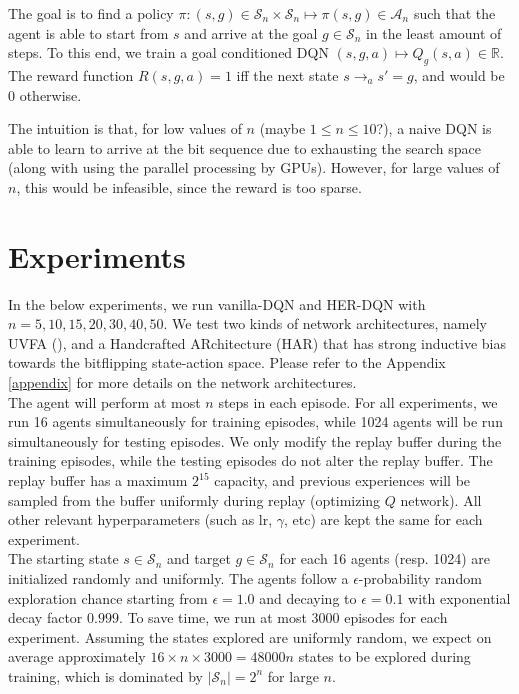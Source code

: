 \documentclass{article}
\begin{document}
The goal is to find a policy $\pi: (s,g)  \in \mathcal{S}_n \times \mathcal{S}_n \mapsto \pi(s,g) \in \mathcal{A}_n$ such that the agent is able to start from $s$ and arrive at the goal $g \in \mathcal{S}_n$ in the least amount of steps. To this end, we train a goal conditioned DQN $(s,g,a) \mapsto Q_g(s,a) \in \mathbb{R}$. The reward function $R(s,g,a)=1$ iff the next state $s \rightarrow_a s' = g$, and would be $0$ otherwise.

The intuition is that, for low values of $n$ (maybe $1 \leq n \leq 10$?), a naive DQN is able to learn to arrive at the bit sequence due to exhausting the search space (along with using the parallel processing by GPUs). However, for large values of $n$, this would be infeasible, since the reward is too sparse.


\section{Experiments}
In the below experiments, we run vanilla-DQN and HER-DQN with $n=5,10,15,20,30,40,50$. We test two kinds of network architectures, namely UVFA (\cite{UVFA}), and a Handcrafted ARchitecture (HAR) that has strong inductive bias towards the bitflipping state-action space. Please refer to the Appendix \ref{appendix} for more details on the network architectures. \\

The agent will perform at most $n$ steps in each episode. For all experiments, we run 16 agents simultaneously for training episodes, while 1024 agents will be run simultaneously for testing episodes. We only modify the replay buffer during the training episodes, while the testing episodes do not alter the replay buffer. The replay buffer has a maximum $2^{15}$ capacity, and previous experiences will be sampled from the buffer uniformly during replay (optimizing $Q$ network). All other relevant hyperparameters (such as lr, $\gamma$, etc) are kept the same for each experiment. \\

The starting state $s \in \mathcal{S}_n$ and target $g \in \mathcal{S}_n$ for each 16 agents (resp. 1024) are initialized randomly and uniformly. The agents follow a $\epsilon$-probability random exploration chance starting from $\epsilon=1.0$ and decaying to $\epsilon=0.1$ with exponential decay factor $0.999$. To save time, we run at most 3000 episodes for each experiment. Assuming the states explored are uniformly random, we expect on average approximately $16 \times n \times 3000 = 48000n$ states to be explored during training, which is dominated by $|\mathcal{S}_n|=2^n$ for large $n$.
\end{document}
